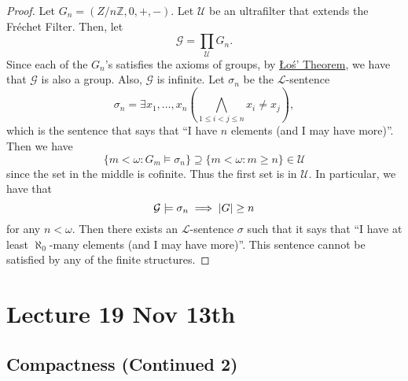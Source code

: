 \documentclass[notoc,notitlepage]{tufte-book}
\begin{document}
\begin{proof}
  Let $G_n = \left( Z / n \mathbb{Z}, 0, + , - \right)$. Let $\mathcal{U}$ be an ultrafilter that extends the Fr\'{e}chet Filter. Then, let
  \begin{equation*}
    \mathcal{G} = \prod_{\mathcal{U}} G_n.
  \end{equation*}
  Since each of the $G_n$'s satisfies the axioms of groups, by \hyperref[thm:los]{{\L}o\'{s}' Theorem}, we have that $\mathcal{G}$ is also a group. Also, $\mathcal{G}$ is infinite. Let $\sigma_n$ be the $\mathcal{L}$-sentence
  \begin{equation*}
    \sigma_n = \exists x_1, \ldots, x_n \left( \bigwedge_{1 \leq i < j \leq n} x_i \neq x_j \right),
  \end{equation*}
  which is the sentence that says that ``I have $n$ elements (and I may have more)''. Then we have
  \begin{equation*}
    \{ m < \omega : G_m \models \sigma_n \} \supseteq \{ m < \omega : m \geq n \} \in \mathcal{U}
  \end{equation*}
  since the set in the middle is cofinite. Thus the first set is in $\mathcal{U}$. In particular, we have that
  \begin{equation*}
    \mathcal{G} \models \sigma_n \implies \left| G \right| \geq n
  \end{equation*}
  for any $n < \omega$. Then there exists an $\mathcal{L}$-sentence $\sigma$ such that it says that ``I have at least $\aleph_0$-many elements (and I may have more)''. This sentence cannot be satisfied by any of the finite structures.
\end{proof}




\chapter{Lecture 19 Nov 13th}%
\label{chp:lecture_19_nov_13th}

\section{Compactness (Continued 2)}%
\label{sec:compactness_continued_2}
\end{document}
